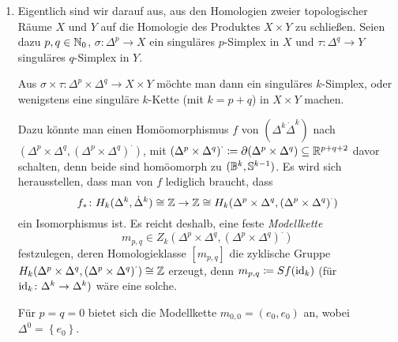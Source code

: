 \begin{motivation}
  \begin{enumerate}
    \item
      Eigentlich sind wir darauf aus, aus den Homologien zweier topologischer Räume $X$ und $Y$ auf die Homologie des Produktes $X \times Y$ zu schließen.
      Seien dazu $p,q \in \mathbb{N}_0$, $\sigma \colon \Delta^p \to X$ ein singuläres $p$-Simplex in $X$ und $\tau \colon \Delta^q \to Y$ singuläres $q$-Simplex in $Y$.

      Aus $\sigma \times \tau \colon \Delta^p \times \Delta^q \to X \times Y$ möchte man dann ein singuläres $k$-Simplex, oder wenigstens eine singuläre $k$-Kette (mit $k = p + q$) in $X \times Y$ machen.

      Dazu könnte man einen Homöomorphismus $f$ von $(\Delta^k \dot\Delta^k)$ nach $(\Delta^p \times \Delta^q, {(\Delta^p \times \Delta^q)}^\cdot)$, mit ${(\Delta^p \times \Delta^q)}^\cdot \coloneqq \partial(\Delta^p \times \Delta^q) \subseteq \mathbb{R}^{p+q+2}$ davor schalten, denn beide sind homöomorph zu $(\mathbb{B}^k, \mathbb{S}^{k-1})$.
      Es wird sich herausstellen, dass man von $f$ lediglich braucht, dass
      \begin{equation*}
        f_* \colon H_k(\Delta^k, \dot\Delta^k) \cong \mathbb{Z} \to \mathbb{Z} \cong H_k(\Delta^p \times \Delta^q, {(\Delta^p \times \Delta^q)}^\cdot)
      \end{equation*}
      ein Isomorphismus ist.
      Es reicht deshalb, eine feste \emph{Modellkette}
      \begin{equation*}
        m_{p,q} \in Z_k (\Delta^p \times \Delta^q, {(\Delta^p \times \Delta^q)}^\cdot)
      \end{equation*}
      festzulegen, deren Homologieklasse $[m_{p,q}]$ die zyklische Gruppe $H_k(\Delta^p \times \Delta^q, {(\Delta^p \times \Delta^q)}^\cdot) \cong \mathbb{Z}$ erzeugt, denn $m_{p,q} \coloneqq S f (\operatorname{id}_k)$ (für $\operatorname{id}_k \colon \Delta^k \to \Delta^k)$ wäre eine solche.

      Für $p = q = 0$ bietet sich die Modellkette $m_{0,0} = (e_0, e_0)$ an, wobei $\Delta^0 = \left\{ e_0 \right\}$.


\end{enumerate}
\end{motivation}
